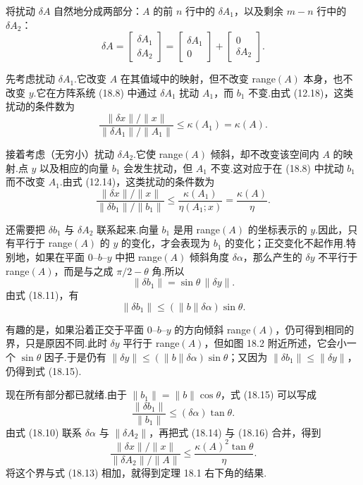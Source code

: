 \documentclass[UTF8,fontset=none,12pt]{ctexart}
\theoremstyle{definition}
\begin{document}
将扰动 $\delta A$ 自然地分成两部分：$A$ 的前 $n$ 行中的 $\delta A_1$，以及剩余 $m-n$ 行中的 $\delta A_2$：
\[
\delta A=\begin{bmatrix}\delta A_1\\\delta A_2\end{bmatrix}
=\begin{bmatrix}\delta A_1\\0\end{bmatrix}
+\begin{bmatrix}0\\\delta A_2\end{bmatrix}.
\]

先考虑扰动 $\delta A_1$.它改变 $A$ 在其值域中的映射，但不改变 range$(A)$ 本身，也不改变 $y$.它在方阵系统 (18.8) 中通过 $\delta A_1$ 扰动 $A_1$，而 $b_1$ 不变.由式 (12.18)，这类扰动的条件数为
\begin{equation}
    \frac{\|\delta x\|/\|x\|}{\|\delta A_1\|/\|A_1\|}
    \le\kappa(A_1)=\kappa(A).
    \tag{18.13}
\end{equation}

接着考虑（无穷小）扰动 $\delta A_2$.它使 range$(A)$ 倾斜，却不改变该空间内 $A$ 的映射.点 $y$ 以及相应的向量 $b_1$ 会发生扰动，但 $A_1$ 不变.这对应于在 (18.8) 中扰动 $b_1$ 而不改变 $A_1$.由式 (12.14)，这类扰动的条件数为
\begin{equation}
    \frac{\|\delta x\|/\|x\|}{\|\delta b_1\|/\|b_1\|}
    \le\frac{\kappa(A_1)}{\eta(A_1;x)}
    =\frac{\kappa(A)}{\eta}.
    \tag{18.14}
\end{equation}

还需要把 $\delta b_1$ 与 $\delta A_2$ 联系起来.向量 $b_1$ 是用 range$(A)$ 的坐标表示的 $y$.因此，只有平行于 range$(A)$ 的 $y$ 的变化，才会表现为 $b_1$ 的变化；正交变化不起作用.特别地，如果在平面 $0$--$b$--$y$ 中把 range$(A)$ 倾斜角度 $\delta\alpha$，那么产生的 $\delta y$ 不平行于 range$(A)$，而是与之成 $\pi/2-\theta$ 角.所以
\[
\|\delta b_1\|=\sin\theta\,\|\delta y\|.
\]
由式 (18.11)，有
\begin{equation}
    \|\delta b_1\|\le(\|b\|\delta\alpha)\sin\theta.
    \tag{18.15}
\end{equation}

有趣的是，如果沿着正交于平面 $0$--$b$--$y$ 的方向倾斜 range$(A)$，仍可得到相同的界，只是原因不同.此时 $\delta y$ 平行于 range$(A)$，但如图 18.2 附近所述，它会小一个 $\sin\theta$ 因子.于是仍有 $\|\delta y\|\le(\|b\|\delta\alpha)\sin\theta$；又因为 $\|\delta b_1\|\le\|\delta y\|$，仍得到式 (18.15).

现在所有部分都已就绪.由于 $\|b_1\|=\|b\|\cos\theta$，式 (18.15) 可以写成
\begin{equation}
    \frac{\|\delta b_1\|}{\|b_1\|}\le(\delta\alpha)\tan\theta.
    \tag{18.16}
\end{equation}
由式 (18.10) 联系 $\delta\alpha$ 与 $\|\delta A_2\|$，再把式 (18.14) 与 (18.16) 合并，得到
\[
\frac{\|\delta x\|/\|x\|}{\|\delta A_2\|/\|A\|}
\le\frac{\kappa(A)^2\tan\theta}{\eta}.
\]
将这个界与式 (18.13) 相加，就得到定理 18.1 右下角的结果.
\end{document}
